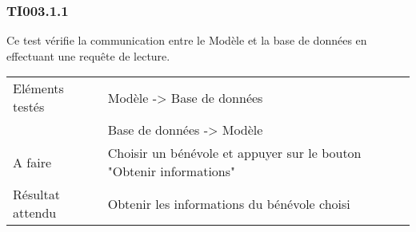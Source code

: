 \subsubsection{TI003.1.1}
  		Ce test vérifie la communication entre le Modèle et la base de données en effectuant une requête de lecture.
  		\begin{center}
    	 		\begin{tabular}[h]{|p{}|p{}|}
			\hline
				Eléments testés & Modèle -> Base de données  \\
							    &  Base de données -> Modèle \\\hline
    				A faire & Choisir un bénévole et appuyer sur le bouton "Obtenir informations" \\\hline
    				Résultat attendu & Obtenir les informations du bénévole choisi \\\hline
     		\end{tabular}
  		\end{center}	
